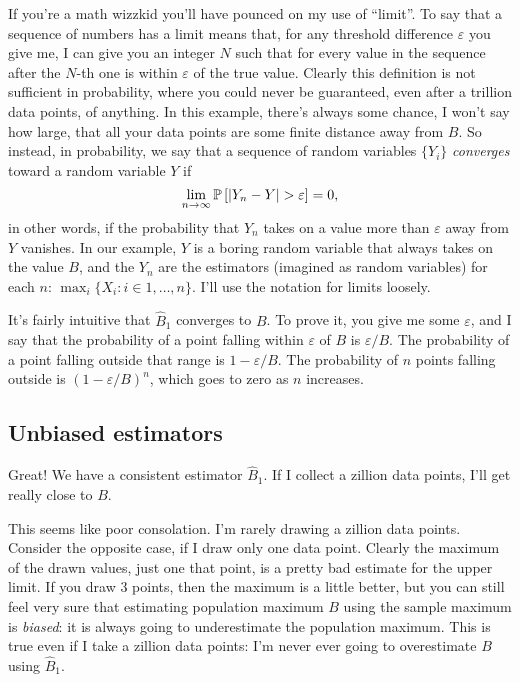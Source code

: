If you're a math wizzkid you'll have pounced on my use of ``limit''. To say that
a sequence of numbers has a limit means that, for any threshold difference
$\varepsilon$ you give me, I can give you an integer $N$ such that for every value
in the sequence after the $N$-th one is within $\varepsilon$ of the true value.
Clearly this definition is not sufficient in probability, where you could never
be guaranteed, even after a trillion data points, of anything. In this example, there's always some
chance, I won't say how large, that all your data points are some finite distance away from $B$. So instead, in
probability, we say that a sequence of random variables $\{Y_i\}$ \emph{converges}
toward a random variable $Y$ if
\begin{equation}
\lim_{n\to\infty} \mathbb{P}\left[{|Y_n - Y| > \varepsilon}\right] = 0,
\end{equation}
in other words, if the probability that $Y_n$ takes on a value more than $\varepsilon$
away from $Y$ vanishes. In our example, $Y$ is a boring random variable that always
takes on the value $B$, and the $Y_n$ are the estimators (imagined as random variables)
for each $n$: $\max_i \{X_i : i \in 1,\ldots, n\}$. I'll use the notation for limits
loosely.

It's fairly intuitive that $\hat{B}_1$ converges to $B$. To prove it, you give me
some $\varepsilon$, and I say that the probability of a point falling within $\varepsilon$
of $B$ is $\varepsilon / B$. The probability of a point falling outside that range
is $1 - \varepsilon/B$. The probability of $n$ points falling outside is $(1 - \varepsilon/B)^n$,
which goes to zero as $n$ increases.

\subsection{Unbiased estimators}

Great! We have a consistent estimator $\hat{B}_1$. If I collect a zillion data
points, I'll get really close to $B$.

This seems like poor consolation. I'm rarely drawing a zillion data points.
Consider the opposite case, if I draw only one data point. Clearly the maximum
of the drawn values, just one that point, is a pretty bad estimate for the
upper limit. If you draw 3 points, then the maximum is a little better, but
you can still feel very sure that estimating population maximum $B$ using the
sample maximum is \emph{biased}: it is always going to underestimate the
population maximum. This is true even if I take a zillion data points: I'm
never ever going to overestimate $B$ using $\hat{B}_1$.


